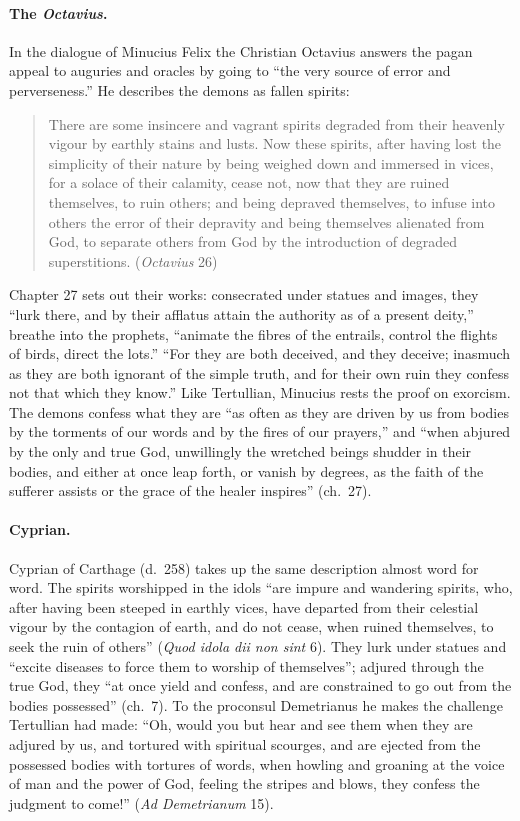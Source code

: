 \paragraph{The \emph{Octavius}.} In the dialogue of Minucius Felix the
Christian Octavius answers the pagan appeal to auguries and oracles by
going to ``the very source of error and perverseness.'' He describes the
demons as fallen spirits:
\begin{quote}
There are some insincere and vagrant spirits degraded from their heavenly
vigour by earthly stains and lusts. Now these spirits, after having lost
the simplicity of their nature by being weighed down and immersed in
vices, for a solace of their calamity, cease not, now that they are ruined
themselves, to ruin others; and being depraved themselves, to infuse into
others the error of their depravity and being themselves alienated from
God, to separate others from God by the introduction of degraded
superstitions. (\emph{Octavius} 26)
\end{quote}
\noindent Chapter 27 sets out their works: consecrated under statues and images,
they ``lurk there, and by their afflatus attain the authority as of a
present deity,'' breathe into the prophets, ``animate the fibres of the
entrails, control the flights of birds, direct the lots.'' ``For they are
both deceived, and they deceive; inasmuch as they are both ignorant of the
simple truth, and for their own ruin they confess not that which they
know.'' Like Tertullian, Minucius rests the proof on exorcism. The demons
confess what they are ``as often as they are driven by us from bodies by
the torments of our words and by the fires of our prayers,'' and ``when
abjured by the only and true God, unwillingly the wretched beings shudder
in their bodies, and either at once leap forth, or vanish by degrees, as
the faith of the sufferer assists or the grace of the healer inspires''
(ch.~27).

\paragraph{Cyprian.} Cyprian of Carthage (d.~258) takes up the same
description almost word for word. The spirits worshipped in the idols
``are impure and wandering spirits, who, after having been steeped in
earthly vices, have departed from their celestial vigour by the contagion
of earth, and do not cease, when ruined themselves, to seek the ruin of
others'' (\emph{Quod idola dii non sint} 6). They lurk under statues and
``excite diseases to force them to worship of themselves''; adjured
through the true God, they ``at once yield and confess, and are
constrained to go out from the bodies possessed'' (ch.~7). To the
proconsul Demetrianus he makes the challenge Tertullian had made: ``Oh,
would you but hear and see them when they are adjured by us, and tortured
with spiritual scourges, and are ejected from the possessed bodies with
tortures of words, when howling and groaning at the voice of man and the
power of God, feeling the stripes and blows, they confess the judgment to
come!'' (\emph{Ad Demetrianum} 15).

